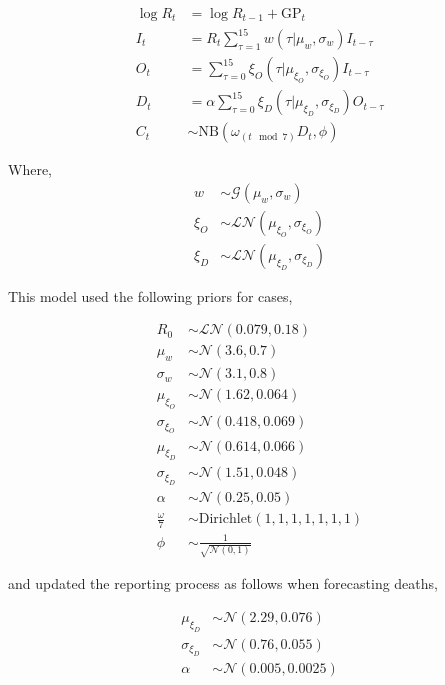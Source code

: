 \documentclass[
]{article}
\begin{document}
\begin{align}
  \log R_{t} &= \log R_{t-1} + \mathrm{GP}_t \\
  I_t &= R_t \sum_{\tau = 1}^{15} w(\tau | \mu_{w}, \sigma_{w}) I_{t - \tau} \\
  O_t &= \sum_{\tau = 0}^{15} \xi_{O}(\tau | \mu_{\xi_{O}}, \sigma_{\xi_{O}}) I_{t-\tau} \\
  D_t &= \alpha \sum_{\tau = 0}^{15} \xi_{D}(\tau | \mu_{\xi_{D}}, \sigma_{\xi_{D}}) O_{t-\tau} \\ 
  C_t &\sim \mathrm{NB}\left(\omega_{(t \mod 7)}D_t, \phi\right)
\end{align}

Where,
\begin{align}
     w &\sim \mathcal{G}(\mu_{w}, \sigma_{w}) \\
    \xi_{O} &\sim \mathcal{LN}(\mu_{\xi_{O}}, \sigma_{\xi_{O}}) \\
    \xi_{D} &\sim \mathcal{LN}(\mu_{\xi_{D}}, \sigma_{\xi_{D}}) 
\end{align}

This model used the following priors for cases,

\begin{align}
     R_0 &\sim \mathcal{LN}(0.079, 0.18) \\
    \mu_w &\sim \mathcal{N}(3.6, 0.7) \\
    \sigma_w &\sim \mathcal{N}(3.1, 0.8) \\
    \mu_{\xi_{O}} &\sim \mathcal{N}(1.62, 0.064) \\
    \sigma_{\xi_{O}} &\sim \mathcal{N}(0.418, 0.069) \\
    \mu_{\xi_{D}} &\sim \mathcal{N}(0.614, 0.066) \\
    \sigma_{\xi_{D}} &\sim \mathcal{N}(1.51, 0.048) \\
    \alpha &\sim \mathcal{N}(0.25, 0.05) \\
    \frac{\omega}{7} &\sim \mathrm{Dirichlet}(1, 1, 1, 1, 1, 1, 1) \\
    \phi &\sim \frac{1}{\sqrt{\mathcal{N}(0, 1)}}
\end{align}

and updated the reporting process as follows when forecasting deaths,

\begin{align}
    \mu_{\xi_{D}} &\sim \mathcal{N}(2.29, 0.076) \\
    \sigma_{\xi_{D}} &\sim \mathcal{N}(0.76, 0.055) \\
    \alpha &\sim \mathcal{N}(0.005, 0.0025) 
\end{align}
\end{document}
